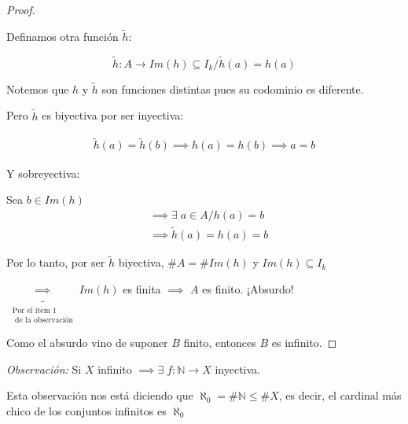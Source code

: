 \begin{enumerate}
\begin{proof}
\begin{enumerate}
                    Definamos otra función $\tilde{h}$:

                    \[\tilde{h}: A \to Im(h) \subseteq I_k/\tilde{h}(a)=h(a)\]

                    Notemos que $h$ y $\tilde{h}$ son funciones distintas pues
                    su codominio es diferente.

                    Pero $\tilde{h}$ es biyectiva por ser inyectiva:

                    \begin{gather*}
                        \tilde{h}(a) = \tilde{h}(b) 
                        \implies h(a) = h(b) \implies a = b
                    \end{gather*}

                    Y sobreyectiva:

                    Sea $b \in Im(h)$
                    \begin{align*}
                        &\implies \exists \; a \in A / h(a) = b \\
                        &\implies \tilde{h}(a) = h(a) = b
                    \end{align*}

                    \medskip

                    Por lo tanto, por ser $\tilde{h}$ biyectiva,
                    $\#A = \#Im(h)$
                    y 
                    $Im(h) \subseteq I_k$

                $\underbrace{\implies}_{\substack{\text{Por el item 1}\\%
                \text{ de la observación}}} %
                Im(h)$ es finita
                $\implies$ 
                $A$ es finito. ¡Absurdo!
            \end{enumerate}

            Como el absurdo vino de suponer $B$ finito, entonces $B$ es
            infinito.

        \end{proof}
\end{enumerate}

\bigskip
\textit{Observación:} 
Si $X$ infinito $\implies \exists\; f:\mathbb{N}\to X$ inyectiva.

\medskip

Esta observación nos está diciendo que $\aleph_0 = \# \mathbb{N} \leq \# X$,
es decir, el cardinal más chico de los conjuntos infinitos es $\aleph_0$

